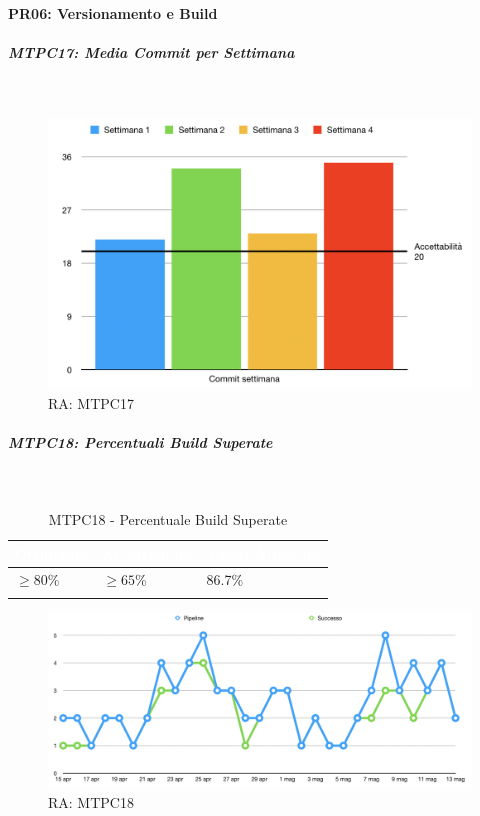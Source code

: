 \paragraph{PR06: Versionamento e Build}

\subparagraph{MTPC17: Media Commit per Settimana} \-\\

\begin{figure}[H]
	\begin{center}
		\includegraphics[scale=0.5]{./images/grafici_RA/MTPC17.png} 
		\caption{RA: MTPC17}
	\end{center}
\end{figure}

\subparagraph{MTPC18: Percentuali Build Superate } \-\\

\begin{longtable}{|C{.15\textwidth}|C{.24\textwidth}|C{.24\textwidth}|}
	\hline
	\textbf{\textcolor{white}{Ottimalità}} & \textbf{\textcolor{white}{Accettabilità}} & \textbf{\textcolor{white}{Valore Misurato}} \\
	\hline \hline
	\endfirsthead
	$\geq 80$\% & $\geq 65$\% & 86.7\% \\
	\hline
	\caption{MTPC18 - Percentuale Build Superate}
\end{longtable}

\begin{figure}[H]
	\begin{center}
		\includegraphics[scale=0.4]{./images/grafici_RA/MTPC18.png} 
		\caption{RA: MTPC18}
	\end{center}
\end{figure}

